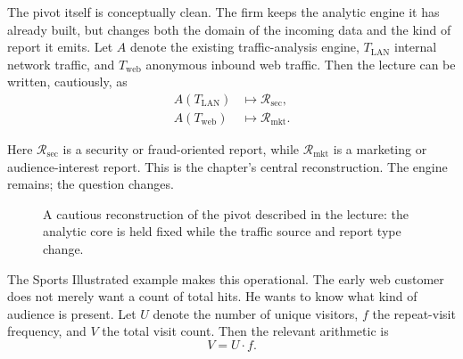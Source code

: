 The pivot itself is conceptually clean. The firm keeps the analytic engine it has already built, but changes both the domain of the incoming data and the kind of report it emits. Let \(A\) denote the existing traffic-analysis engine, \(T_{\mathrm{LAN}}\) internal network traffic, and \(T_{\mathrm{web}}\) anonymous inbound web traffic. Then the lecture can be written, cautiously, as
\begin{align}
A(T_{\mathrm{LAN}}) &\mapsto \mathcal{R}_{\mathrm{sec}},\\
A(T_{\mathrm{web}}) &\mapsto \mathcal{R}_{\mathrm{mkt}}.
\end{align}

Here \(\mathcal{R}_{\mathrm{sec}}\) is a security or fraud-oriented report, while \(\mathcal{R}_{\mathrm{mkt}}\) is a marketing or audience-interest report. This is the chapter's central reconstruction. The engine remains; the question changes.

\begin{figure}[h]
\centering
{}
\caption{A cautious reconstruction of the pivot described in the lecture: the analytic core is held fixed while the traffic source and report type change.}
\end{figure}

The Sports Illustrated example makes this operational. The early web customer does not merely want a count of total hits. He wants to know what kind of audience is present. Let \(U\) denote the number of unique visitors, \(f\) the repeat-visit frequency, and \(V\) the total visit count. Then the relevant arithmetic is
\begin{equation}
V = U\cdot f.
\end{equation}

